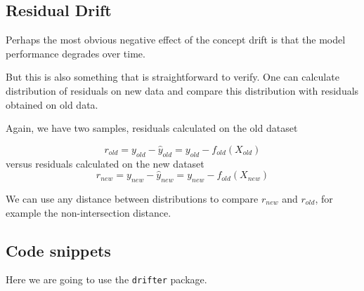 \documentclass[]{krantz}
\newenvironment{Shaded}{\begin{snugshade}}{\end{snugshade}}
\newcommand{\ControlFlowTok}[1]{\textcolor[rgb]{0.13,0.29,0.53}{\textbf{#1}}}
\newcommand{\DataTypeTok}[1]{\textcolor[rgb]{0.13,0.29,0.53}{#1}}
\newcommand{\DecValTok}[1]{\textcolor[rgb]{0.00,0.00,0.81}{#1}}
\newcommand{\KeywordTok}[1]{\textcolor[rgb]{0.13,0.29,0.53}{\textbf{#1}}}
\newcommand{\NormalTok}[1]{#1}
\newcommand{\OperatorTok}[1]{\textcolor[rgb]{0.81,0.36,0.00}{\textbf{#1}}}
\newcommand{\StringTok}[1]{\textcolor[rgb]{0.31,0.60,0.02}{#1}}
\theoremstyle{definition}
\theoremstyle{definition}
\theoremstyle{definition}
\theoremstyle{remark}
\begin{document}
\hypertarget{residual-drift}{%
\subsection{Residual Drift}\label{residual-drift}}

Perhaps the most obvious negative effect of the concept drift is that
the model performance degrades over time.

But this is also something that is straightforward to verify. One can
calculate distribution of residuals on new data and compare this
distribution with residuals obtained on old data.

Again, we have two samples, residuals calculated on the old dataset

\[
r_{old} = y_{old} - \hat y_{old} = y_{old} - f_{old}(X_{old})
\] versus residuals calculated on the new dataset \[
r_{new} = y_{new} - \hat y_{new} = y_{new} - f_{old}(X_{new})
\]

We can use any distance between distributions to compare \(r_{new}\) and
\(r_{old}\), for example the non-intersection distance.

\hypertarget{code-snippets-3}{%
\subsection{Code snippets}\label{code-snippets-3}}

Here we are going to use the \texttt{drifter} package.

\begin{Shaded}
\end{Shaded}
\end{document}
